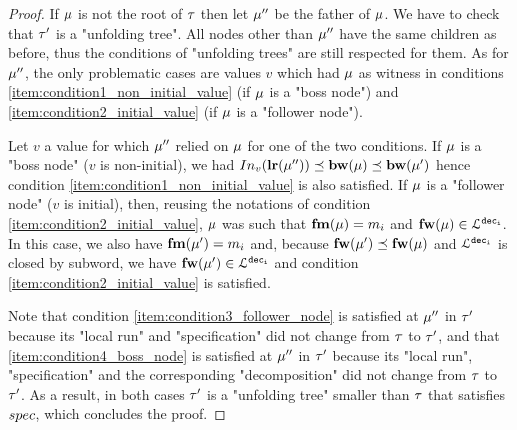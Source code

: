 \begin{proof}
	
	If  $\mu$ is not the root of $\tau$ then let $\mu''$ be the father of $\mu$. We have to check that $\tau'$ is a "unfolding tree". 
	All nodes other than $\mu''$ have the same children as before, thus the conditions of "unfolding trees" are still respected for them.
	As for $\mu''$, the only problematic cases are values $v$ which had $\mu$ as witness in conditions \ref{item:condition1_non_initial_value} (if $\mu$ is a "boss node") and \ref{item:condition2_initial_value} (if $\mu$ is a "follower node").

	Let $v$ a value for which $\mu''$ relied on $\mu$ for one of the two conditions. 
	If $\mu$ is a "boss node" ($v$ is non-initial), we had $\vinput{v}{\localrunlabel{\node''}} \subword \bosslabel{\node} \subword \bosslabel{\node'}$ hence condition \ref{item:condition1_non_initial_value} is also satisfied. If $\mu$ is a "follower node" ($v$ is initial), then, reusing the notations of condition \ref{item:condition2_initial_value}, $\mu$ was such that $\mathbf{fm}(\mu) = m_i$ and $\mathbf{fw}(\mu) \in \mathcal{L}^{\mathtt{\mathtt{dec}_i}}$. In this case, we also have $\mathbf{fm}(\mu') = m_i$ and, because $\mathbf{fw}(\mu') \preceq \mathbf{fw}(\mu)$ and $\mathcal{L}^{\mathtt{\mathtt{dec}_i}}$ is closed by subword, we have $\mathbf{fw}(\mu') \in \mathcal{L}^{\mathtt{\mathtt{dec}_i}}$ and condition \ref{item:condition2_initial_value} is satisfied.

	Note that condition \ref{item:condition3_follower_node} is satisfied at $\mu''$ in $\tau'$ because its "local run" and "specification" did not change from $\tau$ to $\tau'$, and that \ref{item:condition4_boss_node} is satisfied at $\mu''$ in $\tau'$ because its "local run", "specification" and the corresponding "decomposition" did not change from $\tau$ to $\tau'$.  
	As a result, in both cases $\tau'$ is a "unfolding tree" smaller than $\tau$ that satisfies $\spec$, which concludes the proof. 
\end{proof}

